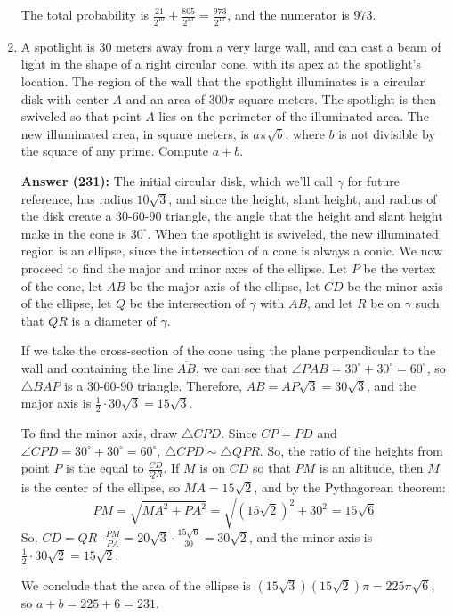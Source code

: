\documentclass{article}
\begin{document}
\begin{enumerate}
The total probability is $\frac{21}{2^{10}} + \frac{805}{2^{13}} = \frac{973}{2^{13}}$, and the numerator is $\boxed{973}$.

\item A spotlight is 30 meters away from a very large wall, and can cast a beam of light in the shape of a right circular cone, with its apex at the spotlight's location. The region of the wall that the spotlight illuminates is a circular disk with center $A$ and an area of $300\pi$ square meters. The spotlight is then swiveled so that point $A$ lies on the perimeter of the illuminated area. The new illuminated area, in square meters, is $a\pi \sqrt{b}$, where $b$ is not divisible by the square of any prime. Compute $a+b$.

\textbf{Answer (231):} The initial circular disk, which we'll call $\gamma$ for future reference, has radius $10\sqrt{3}$, and since the height, slant height, and radius of the disk create a 30-60-90 triangle, the angle that the height and slant height make in the cone is $30^{\circ}$. When the spotlight is swiveled, the new illuminated region is an ellipse, since the intersection of a cone is always a conic. We now proceed to find the major and minor axes of the ellipse. Let $P$ be the vertex of the cone, let $AB$ be the major axis of the ellipse, let $CD$ be the minor axis of the ellipse, let $Q$ be the intersection of $\gamma$ with $AB$, and let $R$ be on $\gamma$ such that $QR$ is a diameter of $\gamma$.

If we take the cross-section of the cone using the plane perpendicular to the wall and containing the line $\overline{AB}$, we can see that $\angle PAB = 30^{\circ}+30^{\circ}=60^{\circ}$, so $\triangle BAP$ is a 30-60-90 triangle. Therefore, $AB = AP\sqrt{3} = 30\sqrt{3}$, and the major axis is $\frac{1}{2} \cdot 30\sqrt{3} = 15\sqrt{3}$.

To find the minor axis, draw $\triangle CPD$. Since $CP = PD$ and $\angle CPD = 30^{\circ}+30^{\circ}=60^{\circ}$, $\triangle CPD \sim \triangle QPR$. So, the ratio of the heights from point $P$ is the equal to $\frac{CD}{QR}$. If $M$ is on $CD$ so that $PM$ is an altitude, then $M$ is the center of the ellipse, so $MA = 15\sqrt{2}$, and by the Pythagorean theorem: \[ PM=\sqrt{MA^2+PA^2}=\sqrt{(15\sqrt{2})^2+30^2}=15\sqrt{6} \] So, $CD = QR \cdot \frac{PM}{PA} = 20\sqrt{3} \cdot \frac{15\sqrt{6}}{30} = 30\sqrt{2}$, and the minor axis is $\frac{1}{2} \cdot 30\sqrt{2} = 15\sqrt{2}$.

We conclude that the area of the ellipse is $(15\sqrt{3})(15\sqrt{2})\pi = 225\pi\sqrt{6}$, so $a+b=225+6=\boxed{231}$.


\end{enumerate}
\end{document}
